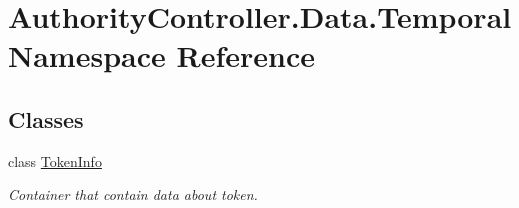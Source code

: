 \hypertarget{namespace_authority_controller_1_1_data_1_1_temporal}{}\section{Authority\+Controller.\+Data.\+Temporal Namespace Reference}
\label{namespace_authority_controller_1_1_data_1_1_temporal}
\subsection*{Classes}
\begin{DoxyCompactItemize}
\item 
class \mbox{\hyperlink{class_authority_controller_1_1_data_1_1_temporal_1_1_token_info}{Token\+Info}}
\begin{DoxyCompactList}\small\item\em Container that contain data about token. \end{DoxyCompactList}\end{DoxyCompactItemize}
